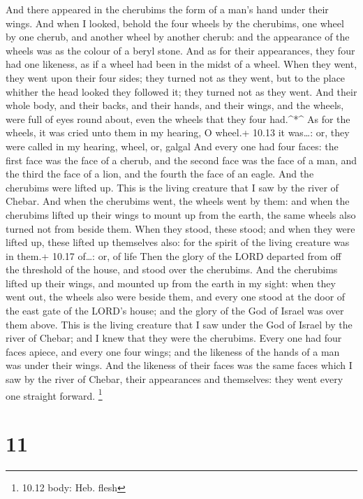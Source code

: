  And there appeared in the cherubims the form of a man's
hand under their wings.  And when I looked, behold the four
wheels by the cherubims, one wheel by one cherub, and another wheel by
another cherub: and the appearance of the wheels was as the colour of a
beryl stone.  And as for their appearances, they four had
one likeness, as if a wheel had been in the midst of a wheel.
 When they went, they went upon their four sides; they
turned not as they went, but to the place whither the head looked they
followed it; they turned not as they went.  And their whole
body, and their backs, and their hands, and their wings, and the wheels,
were full of eyes round about, even the wheels that they four
had.\^{}*\^{}  As for the wheels, it was cried unto them in
my hearing, O wheel.+ 10.13 it was\ldots: or, they were called in my
hearing, wheel, or, galgal  And every one had four faces:
the first face was the face of a cherub, and the second face was the
face of a man, and the third the face of a lion, and the fourth the face
of an eagle.  And the cherubims were lifted up. This is the
living creature that I saw by the river of Chebar.  And
when the cherubims went, the wheels went by them: and when the cherubims
lifted up their wings to mount up from the earth, the same wheels also
turned not from beside them.  When they stood, these stood;
and when they were lifted up, these lifted up themselves also: for the
spirit of the living creature was in them.+ 10.17 of\ldots: or, of life
 Then the glory of the LORD departed from off the threshold
of the house, and stood over the cherubims.  And the
cherubims lifted up their wings, and mounted up from the earth in my
sight: when they went out, the wheels also were beside them, and every
one stood at the door of the east gate of the LORD's house; and the
glory of the God of Israel was over them above.  This is
the living creature that I saw under the God of Israel by the river of
Chebar; and I knew that they were the cherubims.  Every one
had four faces apiece, and every one four wings; and the likeness of the
hands of a man was under their wings.  And the likeness of
their faces was the same faces which I saw by the river of Chebar, their
appearances and themselves: they went every one straight forward.
\footnote{10.12 body: Heb. flesh}

\hypertarget{section-10}{%
\section{11}\label{section-10}}


